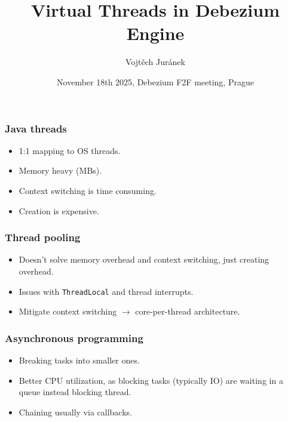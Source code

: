 \documentclass[10pt,utf8]{beamer}
\title{Virtual Threads in Debezium Engine}
\author{Vojtěch Juránek}
\institute[Red Hat]{Red Hat}
\date{November 18th 2025, Debezium F2F meeting, Prague}
\begin{document}
\begin{frame}
    \titlepage
\end{frame}

\begin{frame}
    \frametitle{Java threads}
    \begin{itemize}
        \item 1:1 mapping to OS threads.
        \item Memory heavy (MBs).
        \item Context switching is time consuming.
        \item Creation is expensive.
    \end{itemize}
\end{frame}

\begin{frame}
    \frametitle{Thread pooling}
    \begin{itemize}
        \item Doesn't solve memory overhead and context switching, just creating overhead.
        \item Issues with \texttt{ThreadLocal} and thread interrupts.
        \item Mitigate context switching $\rightarrow$ core-per-thread architecture.
    \end{itemize}
\end{frame}

\begin{frame}
    \frametitle{Asynchronous programming}
    \begin{itemize}
        \item Breaking tasks into smaller ones.
        \item Better CPU utilization, as blocking tasks (typically IO) are waiting in a queue instead blocking thread.
        \item Chaining usually via callbacks.
    \end{itemize}
\end{frame}
\end{document}
